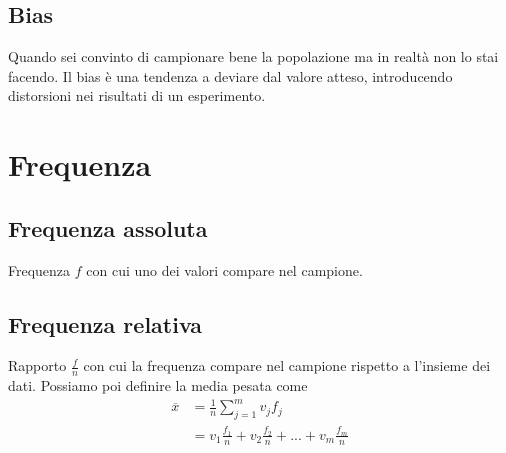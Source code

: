 \documentclass[11pt]{report}
\begin{document}
\subsection{Bias}
Quando sei convinto di campionare bene la popolazione ma in realtà non lo stai facendo. Il bias è una tendenza a deviare dal valore atteso, introducendo distorsioni nei risultati di un esperimento.

\section{Frequenza}
\subsection{Frequenza assoluta}
Frequenza $f$ con cui uno dei valori compare nel campione.
\subsection{Frequenza relativa}
Rapporto $\frac{f}{n}$ con cui la frequenza compare nel campione rispetto a l'insieme dei dati. Possiamo poi definire la media pesata come
\begin{equation}
    \begin{split}
        \overline{x} & = \frac{1}{n}\sum_{j=1}^{m}v_jf_j\\
        & = v_1\frac{f_1}{n} + v_2\frac{f_2}{n} + ... + v_m\frac{f_m}{n}
    \end{split}
\end{equation}
\end{document}
